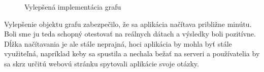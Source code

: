 \begin{figure}[H]
  \caption{Vylepšená implementácia grafu}
  \label{4_Graph}
\end{figure}

Vylepšenie objektu grafu zabezpečilo, že sa aplikácia načítava približne minútu. Boli sme ju teda schopný otestovať na reálnych dátach a výsledky boli pozitívne. Dĺžka načítavania je ale stále neprajná, hoci aplikácia by mohla byť stále využiteľná, napríklad keby sa spustila a nechala bežať na serveri a používatelia by sa skrz určitú webovú stránku spytovali aplikácie svoje otázky.\newline

